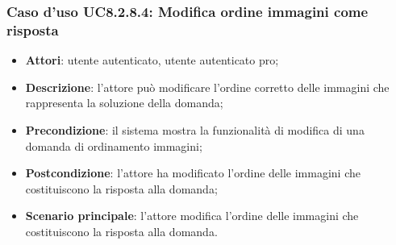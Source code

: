 \subsubsection{Caso d'uso UC8.2.8.4: Modifica ordine immagini come risposta}
\begin{itemize}
	\item\textbf{Attori}: utente autenticato, utente autenticato pro;
	\item\textbf{Descrizione}: l'attore può modificare l'ordine corretto delle immagini che rappresenta la soluzione della domanda;
	\item\textbf{Precondizione}: il sistema mostra la funzionalità di modifica di una domanda di ordinamento immagini; 
	\item \textbf{Postcondizione}: l'attore ha modificato l'ordine delle immagini che costituiscono la risposta alla domanda;
	\item\textbf{Scenario principale}: l'attore modifica l'ordine delle immagini che costituiscono la risposta alla domanda.
\end{itemize}
